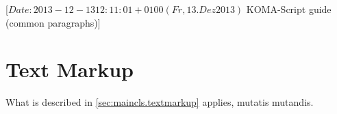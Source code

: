 %
%
%
%
%
%
%
%
% 
%
%
%
%

                 [$Date: 2013-12-13 12:11:01 +0100 (Fr, 13. Dez 2013) $
                  KOMA-Script guide (common paragraphs)]


\makeatletter
{}%
%
%
%
\makeatother


\section{Text Markup}
\label{sec:\csname label@base\endcsname.textmarkup}%
\IgnoreThisfalse
\ifshortversion\IgnoreThistrue\ifCommonmaincls\IgnoreThisfalse\fi\fi%
\ifIgnoreThis %
What is described in
\autoref{sec:maincls.textmarkup} applies, mutatis mutandis.
\else %
%
%

